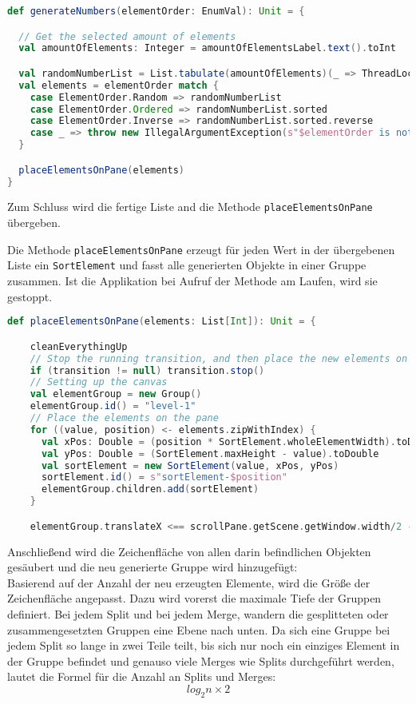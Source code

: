 \begin{lstlisting}[language=Scala,caption=Erstellung der Zahlen-Elemente]
def generateNumbers(elementOrder: EnumVal): Unit = {

  // Get the selected amount of elements
  val amountOfElements: Integer = amountOfElementsLabel.text().toInt

  val randomNumberList = List.tabulate(amountOfElements)(_ => ThreadLocalRandom.current.nextInt(defaultMinimumNumber, defaultMaximumNumber + 1))
  val elements = elementOrder match {
    case ElementOrder.Random => randomNumberList
    case ElementOrder.Ordered => randomNumberList.sorted
    case ElementOrder.Inverse => randomNumberList.sorted.reverse
    case _ => throw new IllegalArgumentException(s"$elementOrder is not supported")
  }

  placeElementsOnPane(elements)
}
\end{lstlisting}

Zum Schluss wird die fertige Liste and die Methode \texttt{placeElementsOnPane} übergeben.

Die Methode \texttt{placeElementsOnPane} erzeugt für jeden Wert in der übergebenen Liste ein \texttt{SortElement} und fasst alle generierten Objekte in einer Gruppe zusammen. Ist die Applikation bei Aufruf der Methode am Laufen, wird sie gestoppt.

\begin{lstlisting}[language=Scala]
  def placeElementsOnPane(elements: List[Int]): Unit = {

    cleanEverythingUp
    // Stop the running transition, and then place the new elements on the pane
    if (transition != null) transition.stop()
    // Setting up the canvas
    val elementGroup = new Group()
    elementGroup.id() = "level-1"
    // Place the elements on the pane
    for ((value, position) <- elements.zipWithIndex) {
      val xPos: Double = (position * SortElement.wholeElementWidth).toDouble
      val yPos: Double = (SortElement.maxHeight - value).toDouble
      val sortElement = new SortElement(value, xPos, yPos)
      sortElement.id() = s"sortElement-$position"
      elementGroup.children.add(sortElement)
    }

    elementGroup.translateX <== scrollPane.getScene.getWindow.width/2 - elementGroup.getBoundsInParent.getWidth/2
\end{lstlisting}

Anschließend wird die Zeichenfläche von allen darin befindlichen Objekten gesäubert und die neu generierte Gruppe wird hinzugefügt:\\
Basierend auf der Anzahl der neu erzeugten Elemente, wird die Größe der Zeichenfläche angepasst. Dazu wird vorerst die maximale Tiefe der Gruppen definiert. Bei jedem Split und bei jedem Merge, wandern die gesplitteten oder zusammengesetzten Gruppen eine Ebene nach unten. Da sich eine Gruppe bei jedem Split so lange in zwei Teile teilt, bis sich nur noch ein einziges Element in der Gruppe befindet und genauso viele Merges wie Splits durchgeführt werden, lautet die Formel für die Anzahl an Splits und Merges:
$$log_2 n \times 2$$

